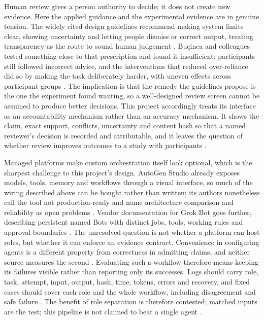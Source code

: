 Human review gives a person authority to decide; it does not create new evidence. Here the
applied guidance and the experimental evidence are in genuine tension. The widely cited design
guidelines recommend making system limits clear, showing uncertainty and letting people dismiss
or correct output, treating transparency as the route to sound human judgement
\citep{amershi2019guidelines}. Bu\c{c}inca and colleagues tested something close to that
prescription and found it insufficient: participants still followed incorrect advice, and the
interventions that reduced over-reliance did so by making the task deliberately harder, with
uneven effects across participant groups \citep{bucinca2021forcing}. The implication is that the
remedy the guidelines propose is the one the experiment found wanting, so a well-designed review
screen cannot be assumed to produce better decisions. This project accordingly treats its
interface as an accountability mechanism rather than an accuracy mechanism. It shows the claim,
exact support, conflicts, uncertainty and content hash so that a named reviewer's decision is
recorded and attributable, and it leaves the question of whether review improves outcomes to a
study with participants \citep{nist2023airmf}.

Managed platforms make custom orchestration itself look optional, which is the sharpest
challenge to this project's design. AutoGen Studio already exposes models, tools, memory and
workflows through a visual interface, so much of the wiring described above can be bought rather
than written; its authors nonetheless call the tool not production-ready and name architecture
comparison and reliability as open problems \citep{dibia2024autogenstudio}. Vendor documentation
for Grok Bot goes further, describing persistent named Bots with distinct jobs, tools, working
rules and approval boundaries \citep{spacexai2026grokbot}. The unresolved question is not
whether a platform can host roles, but whether it can enforce an evidence contract. Convenience
in configuring agents is a different property from correctness in admitting claims, and neither
source measures the second \citep{dibia2024autogenstudio,guo2024multiagent}. Evaluating such a workflow therefore means keeping its failures visible rather than reporting
only its successes. Logs should carry role, task, attempt, input, output, hash, time, tokens,
errors and recovery, and fixed cases should cover each role and the whole workflow, including
disagreement and safe failure
\citep{nist2023airmf,pineau2021reproducibility,guo2024multiagent}. The benefit of role
separation is therefore contested; matched inputs are the test; this pipeline is not claimed to
beat a single agent \citep{fu2026agents,cemri2025masfailures}.


